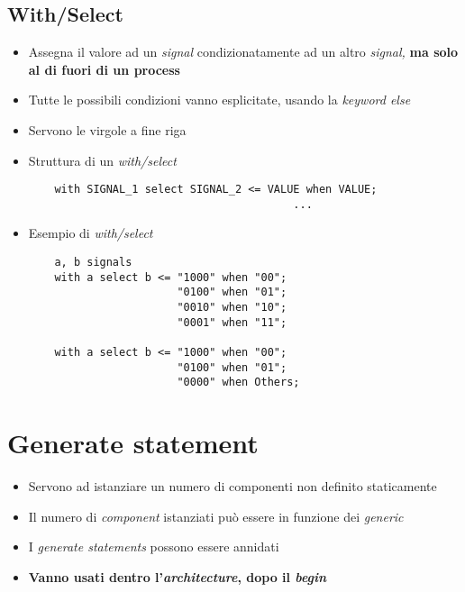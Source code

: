 \documentclass{article}
\begin{document}
\subsection{With/Select}
\begin{itemize}
	\item Assegna il valore ad un \textit{signal} condizionatamente ad un altro \textit{signal, } \textbf{ma solo al di fuori di un process}
	\item Tutte le possibili condizioni vanno esplicitate, usando la \textit{keyword else}
	\item Servono le virgole a fine riga
	\item Struttura di un \textit{with/select}
	\begin{verbatim}
    with SIGNAL_1 select SIGNAL_2 <= VALUE when VALUE;
                                         ...
	      \end{verbatim}
	\item Esempio di \textit{with/select}
	      \begin{verbatim}
    a, b signals
    with a select b <= "1000" when "00";
                       "0100" when "01";
                       "0010" when "10";
                       "0001" when "11";
      
    with a select b <= "1000" when "00";
                       "0100" when "01";
                       "0000" when Others;
	      \end{verbatim}
\end{itemize}


 \newpage

\section{Generate statement}
\begin{itemize}
	\item Servono ad istanziare un numero di componenti non definito staticamente
	\item Il numero di \textit{component} istanziati può essere in funzione dei \textit{generic} 
	\item I \textit{generate statements} possono essere annidati
	\item \textbf{Vanno usati dentro l'\textit{architecture}, dopo il  \textit{begin}}
\end{itemize}
\end{document}

